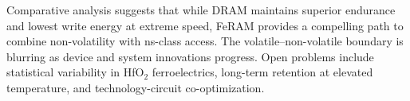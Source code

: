
\noindent
Comparative analysis suggests that while DRAM maintains superior endurance and lowest write energy at extreme speed, FeRAM provides a compelling path to combine non-volatility with ns-class access. The volatile--non-volatile boundary is blurring as device and system innovations progress. Open problems include statistical variability in HfO$_2$ ferroelectrics, long-term retention at elevated temperature, and technology-circuit co-optimization.
